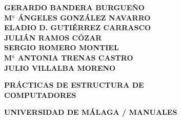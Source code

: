 \documentclass[12pt,a4paper]{book} %
\begin{document}
\frontmatter

\thispagestyle{empty}

\begin{center}
\small \bf
 GERARDO BANDERA BURGUEÑO \\[0.1cm]
 M$^{\underline{a}}$ ÁNGELES GONZÁLEZ NAVARRO \\[0.1cm]
 ELADIO D. GUTIÉRREZ CARRASCO \\[0.1cm]
 JULIÁN RAMOS CÓZAR \\[0.1cm]
 SERGIO ROMERO MONTIEL \\[0.1cm]
 M$^{\underline{a}}$ ANTONIA TRENAS CASTRO \\[0.1cm]
 JULIO VILLALBA MORENO\\[0.1cm]

\vfill

{\Large \bf PRÁCTICAS DE ESTRUCTURA DE \\[0.1cm] COMPUTADORES}

\vfill

\vfill

{\normalsize \bf UNIVERSIDAD DE MÁLAGA / MANUALES}
\end{center}






\mainmatter












\appendix









\backmatter




\end{document}
